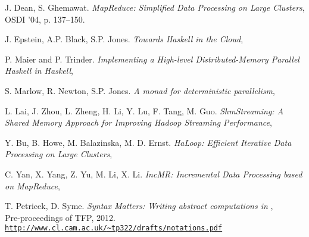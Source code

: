 %
%

\begin{thebibliography}{9}

	 J. Dean, S. Ghemawat. 
		\emph{MapReduce: Simplified Data Processing on Large Clusters}, \\
		OSDI '04, p. 137--150.

	 J. Epstein, A.P. Black, S.P. Jones.
		\emph{Towards Haskell in the Cloud},\\
		
	 P. Maier and P. Trinder.
		\emph{Implementing a High-level Distributed-Memory Parallel Haskell in Haskell},\\
		
	 S. Marlow, R. Newton, S.P. Jones.
		\emph{A monad for deterministic parallelism},\\
		
	 L. Lai, J. Zhou, L. Zheng, H. Li, Y. Lu, F. Tang, M. Guo.
		\emph{ShmStreaming: A Shared Memory Approach for Improving Hadoop Streaming Performance},\\
			
	 Y. Bu, B. Howe, M. Balazinska, M. D. Ernst.
		\emph{HaLoop: Efficient Iterative Data Processing on Large Clusters},\\
		
	 C. Yan, X. Yang, Z. Yu, M. Li, X. Li.
		\emph{IncMR: Incremental Data Processing based on MapReduce},\\
	
	 T. Petricek, D. Syme.
		\emph{Syntax Matters: Writing abstract computations in \fsharp},\\
		Pre-proceedings of TFP, 2012.\\
		\href{http://www.cl.cam.ac.uk/~tp322/drafts/notations.pdf}
			{\texttt{http://www.cl.cam.ac.uk/{\textasciitilde}tp322/drafts/notations.pdf}}


\end{thebibliography}
